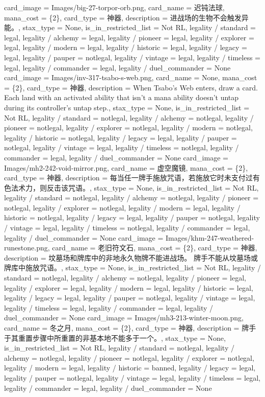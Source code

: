 \documentclass[lang = cn, color = black, 10pt]{AllThatStax}
\begin{document}
\card
{
	card_image = Images/big-27-torpor-orb.png,
	card_name = 迟钝法球,
	mana_cost = \{2\},
	card_type = 神器,
	description = 进战场的生物不会触发异能。,
	stax_type = None,
	is_in_restricted_list = Not RL,
	legality / standard = legal,
	legality / alchemy = legal,
	legality / pioneer = legal,
	legality / explorer = legal,
	legality / modern = legal,
	legality / historic = legal,
	legality / legacy = legal,
	legality / pauper = notlegal,
	legality / vintage = legal,
	legality / timeless = legal,
	legality / commander = legal,
	legality / duel_commander = None
}
\card
{
	card_image = Images/inv-317-tsabo-s-web.png,
	card_name = None,
	mana_cost = \{2\},
	card_type = 神器,
	description = When Tsabo's Web enters, draw a card.
	Each land with an activated ability that isn't a mana ability doesn't untap during its controller's untap step.,
	stax_type = None,
	is_in_restricted_list = Not RL,
	legality / standard = notlegal,
	legality / alchemy = notlegal,
	legality / pioneer = notlegal,
	legality / explorer = notlegal,
	legality / modern = notlegal,
	legality / historic = notlegal,
	legality / legacy = legal,
	legality / pauper = notlegal,
	legality / vintage = legal,
	legality / timeless = notlegal,
	legality / commander = legal,
	legality / duel_commander = None
}
\card
{
	card_image = Images/mh2-242-void-mirror.png,
	card_name = 虚空魔镜,
	mana_cost = \{2\},
	card_type = 神器,
	description = 每当任一牌手施放咒语，若施放它时未支付过有色法术力，则反击该咒语。,
	stax_type = None,
	is_in_restricted_list = Not RL,
	legality / standard = notlegal,
	legality / alchemy = notlegal,
	legality / pioneer = notlegal,
	legality / explorer = notlegal,
	legality / modern = legal,
	legality / historic = notlegal,
	legality / legacy = legal,
	legality / pauper = notlegal,
	legality / vintage = legal,
	legality / timeless = notlegal,
	legality / commander = legal,
	legality / duel_commander = None
}
\card
{
	card_image = Images/khm-247-weathered-runestone.png,
	card_name = 老旧符文石,
	mana_cost = \{2\},
	card_type = 神器,
	description = 坟墓场和牌库中的非地永久物牌不能进战场。
	牌手不能从坟墓场或牌库中施放咒语。,
	stax_type = None,
	is_in_restricted_list = Not RL,
	legality / standard = notlegal,
	legality / alchemy = notlegal,
	legality / pioneer = legal,
	legality / explorer = legal,
	legality / modern = legal,
	legality / historic = legal,
	legality / legacy = legal,
	legality / pauper = notlegal,
	legality / vintage = legal,
	legality / timeless = legal,
	legality / commander = legal,
	legality / duel_commander = None
}
\card
{
	card_image = Images/mh3-213-winter-moon.png,
	card_name = 冬之月,
	mana_cost = \{2\},
	card_type = 神器,
	description = 牌手于其重置步骤中所重置的非基本地不能多于一个。,
	stax_type = None,
	is_in_restricted_list = Not RL,
	legality / standard = notlegal,
	legality / alchemy = notlegal,
	legality / pioneer = notlegal,
	legality / explorer = notlegal,
	legality / modern = legal,
	legality / historic = banned,
	legality / legacy = legal,
	legality / pauper = notlegal,
	legality / vintage = legal,
	legality / timeless = legal,
	legality / commander = legal,
	legality / duel_commander = None
}
\end{document}
